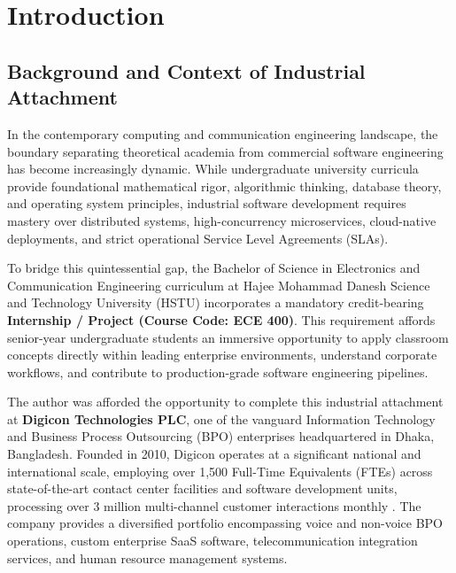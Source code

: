 \chapter{Introduction}
\label{ch:introduction}

\section{Background and Context of Industrial Attachment}
\label{sec:intro_background}

In the contemporary computing and communication engineering landscape, the boundary separating theoretical academia from commercial software engineering has become increasingly dynamic. While undergraduate university curricula provide foundational mathematical rigor, algorithmic thinking, database theory, and operating system principles, industrial software development requires mastery over distributed systems, high-concurrency microservices, cloud-native deployments, and strict operational Service Level Agreements (SLAs).

To bridge this quintessential gap, the Bachelor of Science in Electronics and Communication Engineering curriculum at Hajee Mohammad Danesh Science and Technology University (HSTU) incorporates a mandatory credit-bearing \textbf{Internship / Project (Course Code: ECE 400)}. This requirement affords senior-year undergraduate students an immersive opportunity to apply classroom concepts directly within leading enterprise environments, understand corporate workflows, and contribute to production-grade software engineering pipelines.

The author was afforded the opportunity to complete this industrial attachment at \textbf{Digicon Technologies PLC}, one of the vanguard Information Technology and Business Process Outsourcing (BPO) enterprises headquartered in Dhaka, Bangladesh. Founded in 2010, Digicon operates at a significant national and international scale, employing over 1,500 Full-Time Equivalents (FTEs) across state-of-the-art contact center facilities and software development units, processing over 3 million multi-channel customer interactions monthly \citep{digicon2026corp}. The company provides a diversified portfolio encompassing voice and non-voice BPO operations, custom enterprise SaaS software, telecommunication integration services, and human resource management systems.

